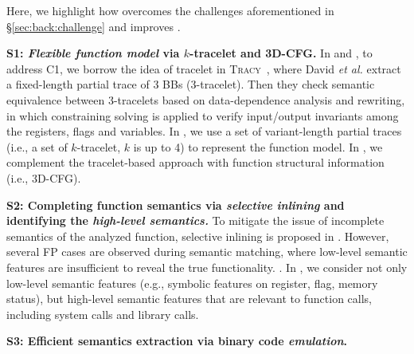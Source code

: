 Here, we highlight how \toolNew overcomes the challenges aforementioned in \S\ref{sec:back:challenge} and improves \tool.

\noindent\textbf{S1: \emph{Flexible function model} via $k$-tracelet and 3D-CFG.}
In \tool and \toolNew, to address C1, we borrow the idea of tracelet in \textsc{Tracy}~\cite{DBLP:conf/pldi/DavidY14}, where David \emph{et al.} extract  a fixed-length partial trace of 3 BBs (3-tracelet). Then they check semantic equivalence between 3-tracelets based on data-dependence analysis
and rewriting, in which constraining solving is applied to verify input/output invariants among the registers, flags and variables. In \tool, we use a set of variant-length partial traces (i.e., a set of $k$-tracelet, $k$ is up to 4) to represent the function model. In \toolNew, we complement the tracelet-based approach with function structural information (i.e., 3D-CFG). %

\noindent\textbf{S2: Completing function semantics via \emph{selective inlining} and identifying the \emph{high-level semantics.}}
To mitigate the issue of incomplete semantics of the analyzed function, selective inlining is proposed in \tool. However,  several FP cases are observed during semantic matching, where low-level
semantic features are insufficient to reveal the true functionality. . In \toolNew, we consider not only low-level semantic features (e.g., symbolic features on register, flag, memory status), but high-level semantic features that are relevant  to function calls, including system calls and library calls. %

\noindent\textbf{S3: Efficient semantics extraction via binary code \emph{emulation}.}


